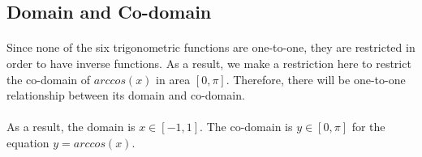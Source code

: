 \documentclass[10pt]{article}
\begin{document}
\subsection{Domain and Co-domain}
\paragraph{}
Since none of the six trigonometric functions are one-to-one, they are restricted in order to have inverse functions. As a result, we make a restriction here to restrict the co-domain of $arccos(x)$ in area $[0, \pi]$. Therefore, there will be one-to-one relationship between its domain and co-domain.

\paragraph{}
As a result, the domain is $x \in [-1, 1]$. The co-domain is $y \in [0, \pi]$ for the equation $y = arccos(x)$.
\end{document}

